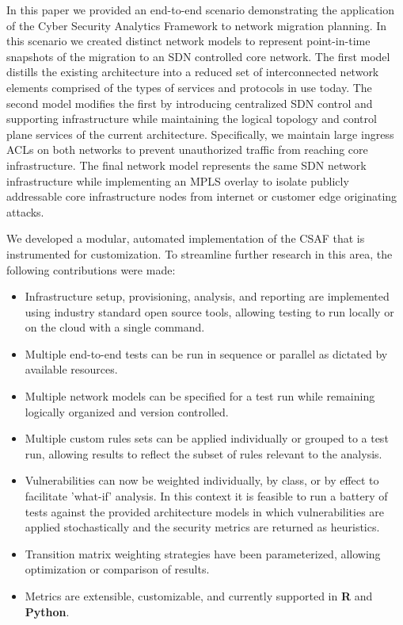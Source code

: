 In this paper we provided an end-to-end scenario demonstrating the application of the Cyber Security Analytics Framework to network migration planning. In this scenario we created distinct network models to represent point-in-time snapshots of the migration to an SDN controlled core network. The first model distills the existing architecture into a reduced set of interconnected network elements comprised of the types of services and protocols in use today. The second model modifies the first by introducing centralized SDN control and supporting infrastructure while maintaining the logical topology and control plane services of the current architecture. Specifically, we maintain large ingress ACLs on both networks to prevent unauthorized traffic from reaching core infrastructure. The final network model represents the same SDN network infrastructure while implementing an MPLS overlay to isolate publicly addressable core infrastructure nodes from internet or customer edge originating attacks.  

We developed a modular, automated implementation of the CSAF that is instrumented for customization. To streamline further research in this area, the following contributions were made:
\begin{itemize}
\item Infrastructure setup, provisioning, analysis, and reporting are implemented using industry standard open source tools, allowing testing to run locally or on the cloud with a single command. 
\end{itemize}
\begin{itemize}
\item Multiple end-to-end tests can be run in sequence or parallel as dictated by available resources.
\item Multiple network models can be specified for a test run while remaining logically organized and version controlled. 
\item Multiple custom rules sets can be applied individually or grouped to a test run, allowing results to reflect the subset of rules relevant to the analysis.
\item Vulnerabilities can now be weighted individually, by class, or by effect to facilitate 'what-if' analysis. In this context it is feasible to run a battery of tests against the provided architecture models in which vulnerabilities are applied stochastically and the security metrics are returned as heuristics.
\item  Transition matrix weighting strategies have been parameterized, allowing optimization or comparison of results. 
\item Metrics are extensible, customizable, and currently supported in \textbf{R} and \textbf{Python}. 
\end{itemize}

